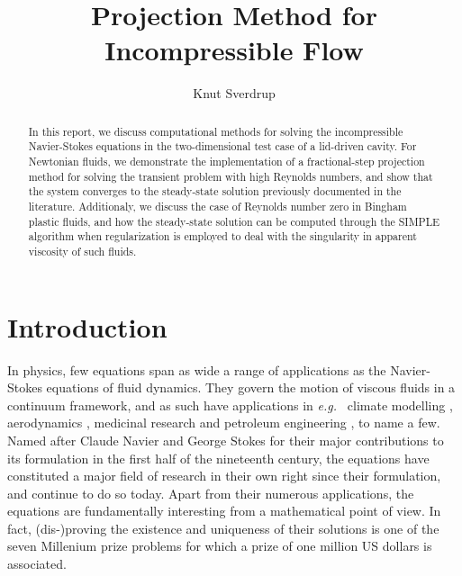 \documentclass[final,3p,twocolumn]{elsarticle}
\begin{document}
\begin{frontmatter}

\title{Projection Method for Incompressible Flow}

\author{Knut Sverdrup}

\begin{abstract}
    In this report, we discuss computational methods for solving the
    incompressible Navier-Stokes equations in the two-dimensional test case of
    a lid-driven cavity. For Newtonian fluids, we demonstrate the
    implementation of a fractional-step projection method for solving the
    transient problem with high Reynolds numbers, and show that the system
    converges to the steady-state solution previously documented in the
    literature. Additionaly, we discuss the case of Reynolds number zero in
    Bingham plastic fluids, and how the steady-state solution can be computed
    through the SIMPLE algorithm when regularization is employed to deal with
    the singularity in apparent viscosity of such fluids. 
\end{abstract}

\end{frontmatter}

\section{Introduction}
\label{sec:introduction}

In physics, few equations span as wide a range of applications as the
Navier-Stokes equations of fluid dynamics. They govern the motion of viscous
fluids in a continuum framework, and as such have applications in {\em e.g.\ }
climate modelling \cite{marshall1997finite, giraldo2008study}, aerodynamics
\cite{rai1987navier, thomas1990navier, jameson1998optimum}, medicinal research
\cite{peskin1977numerical, mihaescu2008large} and petroleum engineering
\cite{deiber1979flow, vinay2006numerical, cardenas2007navier, boyer2010cahn},
to name a few. Named after Claude Navier and George Stokes for their major
contributions \cite{navier1822memoire, stokes1845theories} to its formulation
in the first half of the nineteenth century, the equations have constituted a
major field of research in their own right since their formulation, and
continue to do so today. Apart from their numerous applications, the equations
are fundamentally interesting from a mathematical point of view. In fact,
(dis-)proving the existence and uniqueness of their solutions is one of the
seven Millenium prize problems \cite{fefferman2006existence} for which a prize
of one million US dollars is associated. 
\end{document}
